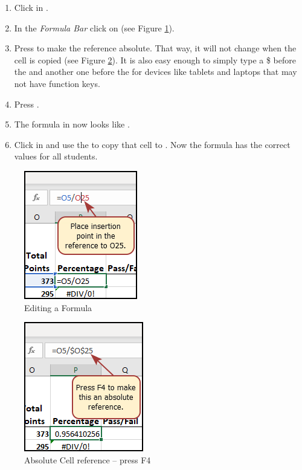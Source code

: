 \begin{enumbox}
	\begin{enumerate}
		\item Click in . 
		\item In the \textit{Formula Bar} click on  (see Figure \ref{03:fig07}).
		\item Press  to make the  reference absolute. That way, it will not change when the cell is copied (see Figure \ref{03:fig08}). It is also easy enough to simply type a \$ before the  and another one before the  for devices like tablets and laptops that may not have function keys.
		\item Press .
		\item The formula in  now looks like .
		\item Click in  and use the  to copy that cell to . Now the formula has the correct values for all students.
	\end{enumerate}
\end{enumbox}
	
\begin{figure}[H]
	\centering
	\includegraphics[width=\maxwidth{.40\linewidth}]{gfx/ch03_fig07}
	\caption{Editing a Formula}
	\label{03:fig07}
\end{figure}

\begin{figure}[H]
	\centering
	\includegraphics[width=\maxwidth{.40\linewidth}]{gfx/ch03_fig08}
	\caption{Absolute Cell reference – press F4}
	\label{03:fig08}
\end{figure}

